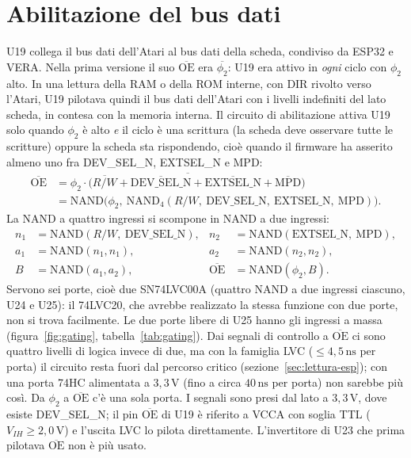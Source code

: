 \documentclass[11pt,a4paper,twoside,openright]{report}
\newcommand{\ns}{\,\mathrm{ns}}
\newcommand{\sig}[1]{\textsf{#1}}
\begin{document}
\section{Abilitazione del bus dati}
\label{sec:gating}

U19 collega il bus dati dell'Atari al bus dati della scheda, condiviso da ESP32 e VERA. Nella
prima versione il suo $\overline{\text{OE}}$ era $\overline{\phi_2}$: U19 era attivo in
\emph{ogni} ciclo con $\phi_2$ alto. In una lettura della RAM o della ROM interne,
con \sig{DIR} rivolto verso l'Atari, U19 pilotava quindi il bus dati dell'Atari con i livelli
indefiniti del lato scheda, in contesa con la memoria interna. Il circuito di abilitazione
attiva U19 solo quando $\phi_2$ è alto \emph{e} il ciclo è una scrittura (la scheda deve
osservare tutte le scritture) oppure la scheda sta rispondendo, cioè quando il firmware ha
asserito almeno uno fra \sig{DEV\_SEL\_N}, \sig{EXTSEL\_N} e \sig{MPD}:
\begin{align}
  \overline{\text{OE}} &= \overline{\phi_2 \cdot \big(\overline{R/W} + \overline{\text{DEV\_SEL\_N}} + \overline{\text{EXTSEL\_N}} + \overline{\text{MPD}}\big)} \nonumber\\
  &= \text{NAND}\big(\phi_2,\ \text{NAND}_4(R/W,\ \text{DEV\_SEL\_N},\ \text{EXTSEL\_N},\ \text{MPD})\big).
\end{align}
La NAND a quattro ingressi si scompone in NAND a due ingressi:
\begin{align}
  n_1 &= \text{NAND}(R/W,\ \text{DEV\_SEL\_N}), & n_2 &= \text{NAND}(\text{EXTSEL\_N},\ \text{MPD}), \nonumber\\
  a_1 &= \text{NAND}(n_1, n_1), & a_2 &= \text{NAND}(n_2, n_2), \nonumber\\
  B &= \text{NAND}(a_1, a_2), & \overline{\text{OE}} &= \text{NAND}(\phi_2, B).
\end{align}
Servono sei porte, cioè due SN74LVC00A (quattro NAND a due ingressi ciascuno, U24 e U25):
il 74LVC20, che avrebbe realizzato la stessa funzione con due porte, non si trova
facilmente. Le due porte libere di U25 hanno gli ingressi a massa (figura~\ref{fig:gating},
tabella~\ref{tab:gating}). Dai segnali di controllo a $\overline{\text{OE}}$ ci sono quattro
livelli di logica invece di due, ma con la famiglia LVC ($\le 4{,}5\ns$ per porta) il
circuito resta fuori dal percorso critico (sezione~\ref{sec:lettura-esp}); con una porta 74HC
alimentata a $3{,}3\,\mathrm{V}$ (fino a circa $40\ns$ per porta) non sarebbe più così. Da
$\phi_2$ a $\overline{\text{OE}}$ c'è una sola porta. I segnali sono presi dal lato a
$3{,}3\,\mathrm{V}$, dove esiste \sig{DEV\_SEL\_N}; il pin $\overline{\text{OE}}$ di U19 è
riferito a VCCA con soglia TTL ($V_{IH} \ge 2{,}0\,\mathrm{V}$) e l'uscita LVC lo pilota
direttamente. L'invertitore di U23 che prima pilotava $\overline{\text{OE}}$ non è più usato.
\end{document}
